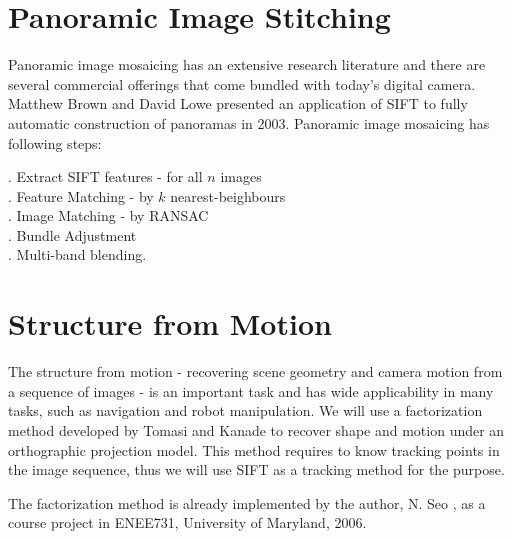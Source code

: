 \documentclass[article,oneside]{memoir}
\begin{document}
\section{Panoramic Image Stitching}

Panoramic image mosaicing has an extensive research literature and there are several commercial offerings that come bundled with today's digital camera. 
Matthew Brown and David Lowe \cite{Panorama} presented an application of SIFT to fully automatic construction of panoramas in 2003.  Panoramic image mosaicing has following steps:

. Extract SIFT features - for all $n$ images\\
. Feature Matching - by $k$ nearest-beighbours\\
. Image Matching - by RANSAC\\
. Bundle Adjustment\\
. Multi-band blending. 

\section{Structure from Motion}

The structure from motion - recovering scene geometry and camera motion from a sequence of images - is an important task and has wide applicability in many tasks, such as navigation and robot manipulation. 
We will use a factorization method developed by Tomasi and Kanade \cite{Tomasi} to recover shape and motion under an orthographic projection model. 
This method requires to know tracking points in the image sequence, thus we will use SIFT as a tracking method for the purpose. 

The factorization method is already implemented by the author, N. Seo \cite{Seo}, as a course project in ENEE731, University of Maryland, 2006. 

\newpage
\end{document}
